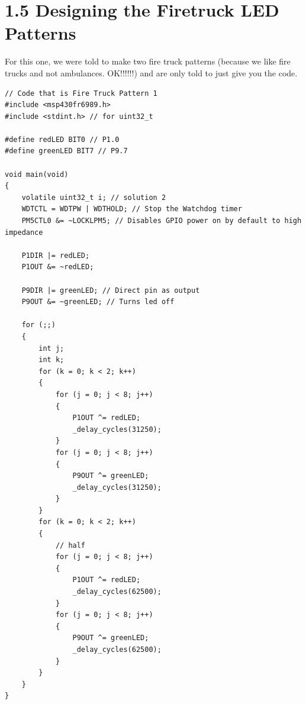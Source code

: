 \documentclass{article}
\begin{document}
\section{1.5 Designing the Firetruck LED Patterns}
For this one, we were told to make two fire truck patterns (because we like fire trucks and not ambulances. OK!!!!!!) and are only told to just give you the code.
\newline
\begin{lstlisting}
// Code that is Fire Truck Pattern 1
#include <msp430fr6989.h>
#include <stdint.h> // for uint32_t

#define redLED BIT0 // P1.0
#define greenLED BIT7 // P9.7

void main(void)
{
    volatile uint32_t i; // solution 2
    WDTCTL = WDTPW | WDTHOLD; // Stop the Watchdog timer
    PM5CTL0 &= ~LOCKLPM5; // Disables GPIO power on by default to high impedance

    P1DIR |= redLED;
    P1OUT &= ~redLED;

    P9DIR |= greenLED; // Direct pin as output
    P9OUT &= ~greenLED; // Turns led off

    for (;;)
    {
        int j;
        int k;
        for (k = 0; k < 2; k++)
        {
            for (j = 0; j < 8; j++)
            {
                P1OUT ^= redLED;
                _delay_cycles(31250);
            }
            for (j = 0; j < 8; j++)
            {
                P9OUT ^= greenLED;
                _delay_cycles(31250);
            }
        }
        for (k = 0; k < 2; k++)
        {
            // half
            for (j = 0; j < 8; j++)
            {
                P1OUT ^= redLED;
                _delay_cycles(62500);
            }
            for (j = 0; j < 8; j++)
            {
                P9OUT ^= greenLED;
                _delay_cycles(62500);
            }
        }
    }
}
\end{lstlisting}
\newpage
\end{document}
